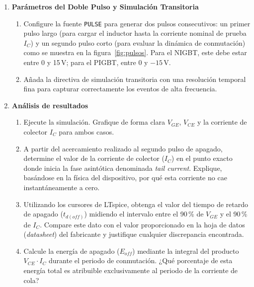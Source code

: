 \documentclass[12pt,a4paper]{article}
\begin{document}
\begin{enumerate}
  \item \textbf{Parámetros del Doble Pulso y Simulación Transitoria}
        \begin{enumerate}
          \item Configure la fuente \texttt{PULSE} para generar dos pulsos consecutivos:
                un primer pulso largo (para cargar el inductor hasta la
                corriente nominal de prueba $I_C$) y un segundo pulso corto
                (para evaluar la dinámica de conmutación) como se muestra en
                la figura~\ref{fig:pulsos}. Para el NIGBT, este debe estar
                entre 0 y 15\,V; para el PIGBT, entre 0 y $-15$\,V.
          \item Añada la directiva de simulación transitoria con una
                resolución temporal fina para capturar correctamente los
                eventos de alta frecuencia.
        \end{enumerate}

  \item \textbf{Análisis de resultados}
        \begin{enumerate}
        \item Ejecute la simulación. Grafique de forma clara $V_{GE}$,
                $V_{CE}$ y la corriente de colector $I_C$ para ambos casos.
        \item A partir del acercamiento realizado al segundo pulso de
                apagado, determine el valor de la corriente de colector
                ($I_C$) en el punto exacto donde inicia la fase asintótica
                denominada \emph{tail current}. Explique, basándose en la
                física del dispositivo, por qué esta corriente no cae
                instantáneamente a cero.
        \item Utilizando los cursores de LTspice, obtenga el valor del
                tiempo de retardo de apagado ($t_{d(off)}$) midiendo el
                intervalo entre el 90\,\% de $V_{GE}$ y el 90\,\% de $I_C$.
                Compare este dato con el valor proporcionado en la hoja de
                datos (\emph{datasheet}) del fabricante y justifique
                cualquier discrepancia encontrada.
        \item Calcule la energía de apagado ($E_{off}$) mediante la integral
                del producto $V_{CE}\cdot I_C$ durante el periodo de
                conmutación. ¿Qué porcentaje de esta energía total es
                atribuible exclusivamente al periodo de la corriente de cola?


\end{enumerate}
\end{enumerate}
\end{document}
